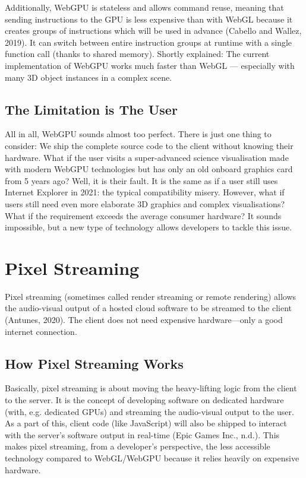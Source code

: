 \documentclass[10pt]{article}
\begin{document}
\begin{sloppypar}
  Additionally, WebGPU is stateless and allows command reuse, meaning that sending instructions to the GPU is less expensive than with WebGL because it creates groups of instructions which will be used in advance (Cabello and Wallez, 2019). It can switch between entire instruction groups at runtime with a single function call (thanks to shared memory). Shortly explained: The current implementation of WebGPU works much faster than WebGL — especially with many 3D object instances in a complex scene.

  \subsection{The Limitation is The User}
  \label{subsec:the-limitation-is-the-user}

  All in all, WebGPU sounds almost too perfect. There is just one thing to consider: We ship the complete source code to the client without knowing their hardware. What if the user visits a super-advanced science visualisation made with modern WebGPU technologies but has only an old onboard graphics card from 5 years ago? Well, it is their fault. It is the same as if a user still uses Internet Explorer in 2021: the typical compatibility misery. However, what if users still need even more elaborate 3D graphics and complex visualisations? What if the requirement exceeds the average consumer hardware? It sounds impossible, but a new type of technology allows developers to tackle this issue.

  \section{Pixel Streaming}
  \label{sec:pixel-streaming}

  Pixel streaming (sometimes called render streaming or remote rendering) allows the audio-visual output of a hosted cloud software to be streamed to the client (Antunes, 2020). The client does not need expensive hardware—only a good internet connection.

  \subsection{How Pixel Streaming Works}
  \label{subsec:how-pixel-streaming-works}

  Basically, pixel streaming is about moving the heavy-lifting logic from the client to the server. It is the concept of developing software on dedicated hardware (with, e.g. dedicated GPUs) and streaming the audio-visual output to the user. As a part of this, client code (like JavaScript) will also be shipped to interact with the server’s software output in real-time (Epic Games Inc., n.d.). This makes pixel streaming, from a developer’s perspective, the less accessible technology compared to WebGL/WebGPU because it relies heavily on expensive hardware.


\end{sloppypar}
\end{document}
